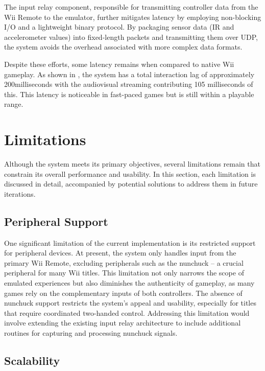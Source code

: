 The input relay component, responsible for transmitting controller data from the
Wii Remote to the emulator, further mitigates latency by employing non-blocking
I/O and a lightweight binary protocol. By packaging sensor data (IR and
accelerometer values) into fixed-length packets and transmitting them over UDP,
the system avoids the overhead associated with more complex data formats.

Despite these efforts, some latency remains when compared to native Wii
gameplay. As shown in , the system
has a total interaction lag of approximately 200milliseconds with the audiovisual
streaming contributing 105 milliseconds of this. This latency is noticeable in
fast-paced games but is still within a playable range.

\section{Limitations}

Although the system meets its primary objectives, several limitations remain that constrain its overall performance and usability. In this section, each limitation is discussed in detail, accompanied by potential solutions to address them in future iterations.

\subsection{Peripheral Support}

One significant limitation of the current implementation is its restricted
support for peripheral devices. At present, the system only handles input from
the primary Wii Remote, excluding peripherals such as the nunchuck -- a crucial peripheral for many Wii
titles. This limitation not only narrows the scope of emulated experiences but
also diminishes the authenticity of gameplay, as many games rely on the
complementary inputs of both controllers. The absence of nunchuck support
restricts the system’s appeal and usability, especially for titles that require
coordinated two-handed control. Addressing this limitation would involve extending
the existing input relay architecture to include additional routines for
capturing and processing nunchuck signals.

\subsection{Scalability}

